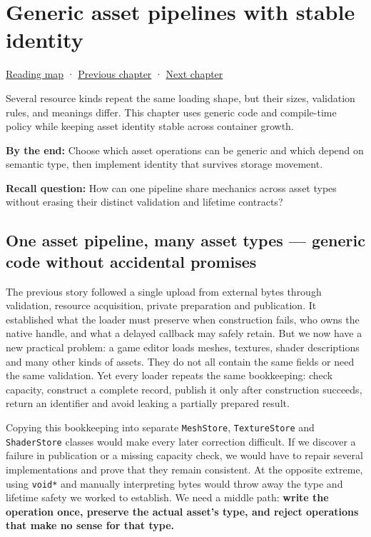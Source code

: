 \hypertarget{05-engine-i-ch005}{}
\chapter{Generic asset pipelines with stable identity}\label{stagechapter:05-engine-i-ch005}\label{05-engine-i-ch005-generic-asset-pipelines-with-stable-identity}

\hyperref[volume-reading-map]{Reading map} · \hyperref[05-engine-i-ch004-resource-ownership-failure-paths-and-review-practice]{Previous chapter} · \hyperref[05-engine-i-ch006-queries-lazy-ranges-allocators-and-module-boundaries]{Next chapter}

Several resource kinds repeat the same loading shape, but their sizes, validation rules, and meanings differ. This chapter uses generic code and compile-time policy while keeping asset identity stable across container growth.

\textbf{By the end:} Choose which asset operations can be generic and which depend on semantic type, then implement identity that survives storage movement.

\textbf{Recall question:} How can one pipeline share mechanics across asset types without erasing their distinct validation and lifetime contracts?

\section{One asset pipeline, many asset types --- generic code without accidental promises}\label{05-engine-i-ch005-one-asset-pipeline-many-asset-types-generic-code-without-accidental-promises}

The previous story followed a single upload from external bytes through validation, resource acquisition, private preparation and publication. It established what the loader must preserve when construction fails, who owns the native handle, and what a delayed callback may safely retain. But we now have a new practical problem: a game editor loads meshes, textures, shader descriptions and many other kinds of assets. They do not all contain the same fields or need the same validation. Yet every loader repeats the same bookkeeping: check capacity, construct a complete record, publish it only after construction succeeds, return an identifier and avoid leaking a partially prepared result.

Copying this bookkeeping into separate \texttt{MeshStore}, \texttt{TextureStore} and \texttt{ShaderStore} classes would make every later correction difficult. If we discover a failure in publication or a missing capacity check, we would have to repair several implementations and prove that they remain consistent. At the opposite extreme, using \texttt{void*} and manually interpreting bytes would throw away the type and lifetime safety we worked to establish. We need a middle path: \textbf{write the operation once, preserve the actual asset's type, and reject operations that make no sense for that type.}

